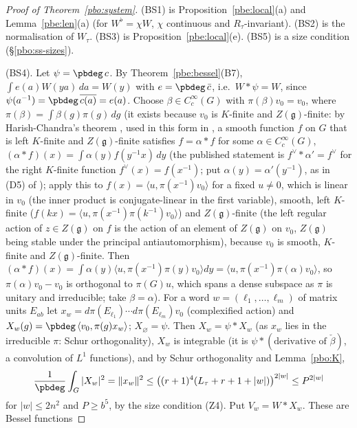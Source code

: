 \documentclass[10pt]{amsart}
\theoremstyle{definition}
\theoremstyle{remark}
\providecommand{\aubar}[1]{\overline{#1}}
\begin{document}
\begin{proof}[Proof of Theorem~\ref{pbo:system}]
(BS1) is Proposition~\ref{pbe:local}(a) and Lemma~\ref{pbe:len}(a) (for $W^\flat=\chi W$, $\chi$ continuous and
$R_\tau$-invariant). (BS2) is the normalisation of $W_\tau$. (BS3) is Proposition~\ref{pbe:local}(e).
(BS5) is a size condition (\S\ref{pbo:ss-sizes}).

(BS4). Let $\psi=\pbdeg\,c$. By Theorem~\ref{pbe:bessel}(B7), $\int e(a)W(ya)\,da=W(y)$ with $e=\pbdeg\,\bar c$,
i.e.\ $W*\psi=W$, since $\psi(a^{-1})=\pbdeg\,\aubar{c(a)}=e(a)$. Choose $\beta\in C^\infty_c(G)$ with $\pi(\beta)
v_0=v_0$, where $\pi(\beta)=\int\beta(g)\pi(g)\,dg$ (it exists because $v_0$ is $K$-finite and
$Z(\mathfrak g)$-finite: by Harish-Chandra's theorem \cite[Theorem~1, p.~18]{HC66}, used in this form in
\cite[Ch.~I, \S4, proof of Lemma~14, p.~15]{HarishChandraAF},
a smooth function $f$ on $G$ that is left $K$-finite and $Z(\mathfrak g)$-finite satisfies $f=\alpha*f$ for some
$\alpha\in C^\infty_c(G)$, $(\alpha*f)(x)=\int\alpha(y)f(y^{-1}x)\,dy$ (the published statement is $f^\vee*\alpha'=f^\vee$
for the right $K$-finite function $f^\vee(x)=f(x^{-1})$; put $\alpha(y)=\alpha'(y^{-1})$, as in (D5) of
{\cite[\S4.2.3]{P53}}); apply this to $f(x)=\langle u,\pi(x^{-1})v_0\rangle$ for a fixed $u\ne0$, which is
linear in $v_0$ (the inner product is conjugate-linear in the first variable), smooth, left $K$-finite
($f(kx)=\langle u,\pi(x^{-1})\pi(k^{-1})v_0\rangle$) and $Z(\mathfrak g)$-finite (the left regular action of
$z\in Z(\mathfrak g)$ on $f$ is the action of an element of $Z(\mathfrak g)$ on $v_0$, $Z(\mathfrak g)$ being stable
under the principal antiautomorphism), because $v_0$ is smooth, $K$-finite and $Z(\mathfrak g)$-finite. Then
$(\alpha*f)(x)=\int\alpha(y)\langle u,\pi(x^{-1})\pi(y)v_0\rangle dy=\langle u,\pi(x^{-1})\pi(\alpha)v_0\rangle$, so
$\pi(\alpha)v_0-v_0$ is orthogonal to $\pi(G)u$, which spans a dense subspace as $\pi$ is unitary and
irreducible; take $\beta=\alpha$). For a word $w=(\ell_1,\dots,\ell_m)$ of matrix units $E_{ab}$ let $x_w=d\pi(E_{\ell_1})\cdots
d\pi(E_{\ell_m})v_0$ (complexified action) and $X_w(g)=\pbdeg\,\langle v_0,\pi(g)x_w\rangle$; $X_\varnothing=\psi$.
Then $X_w=\psi*X_w$ (as $x_w$ lies in the irreducible $\pi$: Schur orthogonality), $X_w$ is integrable (it is
$\psi*(\text{derivative of }\check\beta)$, a convolution of $L^1$ functions), and by Schur orthogonality and
Lemma~\ref{pbo:K},
\[
\frac1{\pbdeg}\int_G|X_w|^2=\|x_w\|^2\le\bigl((r+1)^4(L_\tau+r+1+|w|)\bigr)^{2|w|}\le P^{2|w|}
\]
for $|w|\le2n^2$ and $P\ge b^5$, by the size condition (Z4). Put $V_w=W*X_w$. These are Bessel functions

\end{proof}
\end{document}
